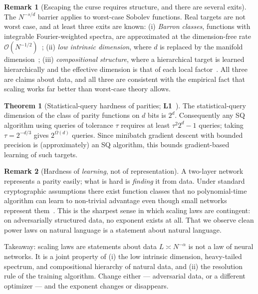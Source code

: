 \documentclass[11pt,a4paper]{article}
\theoremstyle{definition}
\newtheorem{theorem}{Theorem}[section]
\newtheorem{remark}{Remark}[section]
\begin{document}
\begin{remark}[Escaping the curse requires structure, and there are several exits]
The $N^{-s/d}$ barrier applies to worst-case Sobolev functions. Real targets are not worst case, and at least three exits are known: (i) \emph{Barron classes}, functions with integrable Fourier-weighted spectra, are approximated at the dimension-free rate $\mathcal{O}(N^{-1/2})$~\cite{barron1993universal,bach2017breaking}; (ii) \emph{low intrinsic dimension}, where $d$ is replaced by the manifold dimension~\cite{nakada2020adaptive}; (iii) \emph{compositional structure}, where a hierarchical target is learned hierarchically and the effective dimension is that of each local factor~\cite{schmidt2020nonparametric,cagnetta2024rhm}. All three are claims about data, and all three are consistent with the empirical fact that scaling works far better than worst-case theory allows.
\end{remark}

\begin{theorem}[Statistical-query hardness of parities; \textbf{L1}~\cite{kearns1998efficient,blum1994weakly}]
The statistical-query dimension of the class of parity functions on $d$ bits is $2^d$. Consequently any SQ algorithm using queries of tolerance $\tau$ requires at least $\tau^2 2^d - 1$ queries; taking $\tau = 2^{-d/3}$ gives $2^{\Omega(d)}$ queries. Since minibatch gradient descent with bounded precision is (approximately) an SQ algorithm, this bounds gradient-based learning of such targets.
\end{theorem}

\begin{remark}[Hardness of \emph{learning}, not of representation]
A two-layer network represents a parity easily; what is hard is \emph{finding} it from data. Under standard cryptographic assumptions there exist function classes that no polynomial-time algorithm can learn to non-trivial advantage even though small networks represent them~\cite{daniely2021local,shalev2017failures}. This is the sharpest sense in which scaling laws are contingent: on adversarially structured data, no exponent exists at all. That we observe clean power laws on natural language is a statement about natural language.
\end{remark}

\begin{takeaway}{Takeaway: scaling laws are statements about data}
$L\asymp N^{-\alpha}$ is not a law of neural networks. It is a joint property of (i) the low intrinsic dimension, heavy-tailed spectrum, and compositional hierarchy of natural data, and (ii) the resolution rule of the training algorithm. Change either --- adversarial data, or a different optimizer --- and the exponent changes or disappears.
\end{takeaway}
\end{document}
